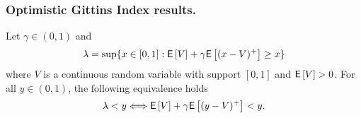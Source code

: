 \subsubsection{Optimistic Gittins Index results.} \label{sec:amgi_results}
\begin{lemma} \label{eq:important_fact}
	Let $\gamma \in (0,1)$ and
	\begin{equation} \label{eq:def_lambda_in_important_equiv}
	\lambda = \sup\{ x \in [0,1] : \mathsf{E} \left[ V \right] + \gamma \mathsf{E} \left[ (x - V)^+ \right] \ge x\}
	\end{equation} 
	where $V$ is a continuous random variable with support $[0,1]$ and $\mathsf{E} \left[ V \right] > 0$. For all $y \in (0,1)$, the following equivalence holds
	\begin{equation} \label{eq:equivlance_lambda1}
	\lambda < y  \Longleftrightarrow \mathsf{E} \left[ V \right] + \gamma 
	\mathsf{E} \left[ (y - V)^+ \right] < y.
	\end{equation}
\end{lemma}
